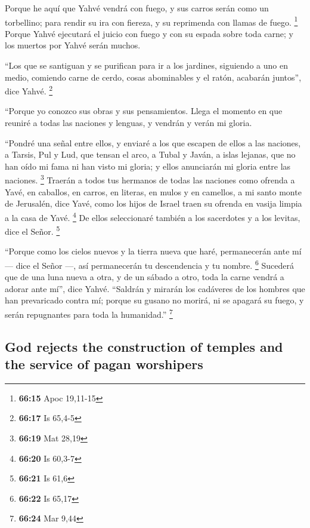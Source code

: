 \begin{paracol}{2}
 Porque he aquí que Yahvé vendrá con fuego, y sus carros
serán como un torbellino; para rendir su ira con fiereza, y su
reprimenda con llamas de fuego. \footnote{\textbf{66:15} Apoc 19,11-15}
 Porque Yahvé ejecutará el juicio con fuego y con su
espada sobre toda carne; y los muertos por Yahvé serán muchos.

 ``Los que se santiguan y se purifican para ir a los
jardines, siguiendo a uno en medio, comiendo carne de cerdo, cosas
abominables y el ratón, acabarán juntos'', dice Yahvé. \footnote{\textbf{66:17}
  Is 65,4-5}

 ``Porque yo conozco sus obras y sus pensamientos. Llega
el momento en que reuniré a todas las naciones y lenguas, y vendrán y
verán mi gloria.

 ``Pondré una señal entre ellos, y enviaré a los que
escapen de ellos a las naciones, a Tarsis, Pul y Lud, que tensan el
arco, a Tubal y Javán, a islas lejanas, que no han oído mi fama ni han
visto mi gloria; y ellos anunciarán mi gloria entre las naciones.
\footnote{\textbf{66:19} Mat 28,19}  Traerán a todos tus
hermanos de todas las naciones como ofrenda a Yavé, en caballos, en
carros, en literas, en mulos y en camellos, a mi santo monte de
Jerusalén, dice Yavé, como los hijos de Israel traen su ofrenda en
vasija limpia a la casa de Yavé. \footnote{\textbf{66:20} Is 60,3-7}
 De ellos seleccionaré también a los sacerdotes y a los
levitas, dice el Señor. \footnote{\textbf{66:21} Is 61,6}

 ``Porque como los cielos nuevos y la tierra nueva que
haré, permanecerán ante mí --- dice el Señor ---, así permanecerán tu
descendencia y tu nombre. \footnote{\textbf{66:22} Is 65,17}
 Sucederá que de una luna nueva a otra, y de un sábado a
otro, toda la carne vendrá a adorar ante mí'', dice Yahvé.
 ``Saldrán y mirarán los cadáveres de los hombres que han
prevaricado contra mí; porque su gusano no morirá, ni se apagará su
fuego, y serán repugnantes para toda la humanidad.'' \footnote{\textbf{66:24}
  Mar 9,44} \switchcolumn \begin{otherlanguage}{english}

\hypertarget{god-rejects-the-construction-of-temples-and-the-service-of-pagan-worshipers}{%
\subsection{God rejects the construction of temples and the service of
pagan
worshipers}\label{god-rejects-the-construction-of-temples-and-the-service-of-pagan-worshipers}}


\end{otherlanguage}
\end{paracol}

